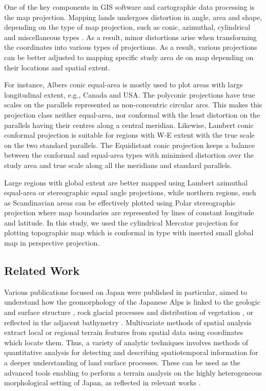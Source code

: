 \documentclass[land,article,submit,pdftex,moreauthors]{Definitions/mdpi}
\begin{document}
One of the key components in GIS software and cartographic data processing is the map projection. Mapping lands undergoes distortion in angle, area and shape, depending on the type of map projection, such as conic, azimuthal, cylindrical and miscellaneous types \cite{Ghaderpour}. As a result, minor distortions arise when transforming the coordinates into various types of projections. As a result, various projections can be better adjusted to mapping specific study area de on map depending on their locations and spatial extent. 

For instance, Albers conic equal-area is mostly used to plot areas with large longitudinal extent, e.g., Canada and USA. The polyconic projections have true scales on the parallels represented as non-concentric circular arcs. This makes this projection class neither equal-area, nor conformal with the least distortion on the parallels having their centres along a central meridian. Likewise, Lambert conic conformal projection is suitable for regions with W-E extent with the true scale on the two standard parallels. The Equidistant conic projection keeps a balance between the conformal and equal-area types with minimised distortion over the study area and true scale along all the meridians and standard parallels. 

Large regions with global extent are better mapped using Lambert azimuthal equal-area or stereographic equal angle projections, while northern regions, such as Scandinavian areas can be effectively plotted using Polar stereographic projection where map boundaries are represented by lines of constant longitude and latitude. In this study, we used the cylindrical Mercator projection for plotting topographic map which is conformal in type with inserted small global map in perspective projection.

\subsection{Related Work}

Various publications focused on Japan were published in particular, aimed to understand how the geomorphology of the Japanese Alps is linked to the geologic and surface structure \cite{MATSUOKA201965}, rock glacial processes and distribution of vegetation \cite{FUJINO2023100146}, or reflected in the adjacent bathymetry \cite{Kariya2002}. Multivariate methods of spatial analysis extract local or regional terrain features from spatial data using coordinates which locate them. Thus, a variety of analytic techniques involves methods of quantitative analysis for detecting and describing spatiotemporal information for a deeper understanding of land surface processes. These can be used as the advanced tools enabling to perform a terrain analysis on the highly heterogeneous morphological setting of Japan, as reflected in relevant works \cite{Oguchi2000,OGUCHI2020106805,MATSUURA2015133,NIWA2021107835,HATTANJI2021107943}. 
\end{document}
